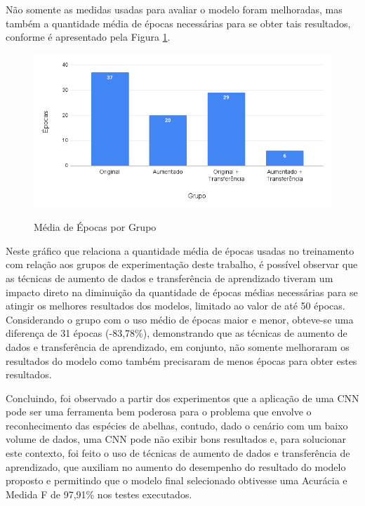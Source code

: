 \documentclass[
	12pt,				%
	oneside,			%
	a4paper,			%
	english,			%
	brazil				%
	]{abntex2ppgsi}
\begin{document}
Não somente as medidas usadas para avaliar o modelo foram melhoradas, mas também a quantidade média de épocas necessárias para se obter tais resultados, conforme é apresentado pela Figura \ref{fig:media_epocas_vs_grupo}.

\begin{figure}[H]
    \centering
    \caption{Média de Épocas por Grupo}
    \includegraphics[width=1.0\textwidth]{imagens/resultados_discussao/conclusao/media_epocas_vs_grupo.png}
    \label{fig:media_epocas_vs_grupo}
\end{figure}

Neste gráfico que relaciona a quantidade média de épocas usadas no treinamento com relação aos grupos de experimentação deste trabalho, é possível observar que as técnicas de aumento de dados e transferência de aprendizado tiveram um impacto direto na diminuição da quantidade de épocas médias necessárias para se atingir os melhores resultados dos modelos, limitado ao valor de até 50 épocas. Considerando o grupo com o uso médio de épocas maior e menor, obteve-se uma diferença de 31 épocas (-83,78\%), demonstrando que as técnicas de aumento de dados e transferência de aprendizado, em conjunto, não somente melhoraram os resultados do modelo como também precisaram de menos épocas para obter estes resultados.

Concluindo, foi observado a partir dos experimentos que a aplicação de uma CNN pode ser uma ferramenta bem poderosa para o problema que envolve o reconhecimento das espécies de abelhas, contudo, dado o cenário com um baixo volume de dados, uma CNN pode não exibir bons resultados e, para solucionar este contexto, foi feito o uso de técnicas de aumento de dados e transferência de aprendizado, que auxiliam no aumento do desempenho do resultado do modelo proposto e permitindo que o modelo final selecionado obtivesse uma Acurácia e Medida F de 97,91\% nos testes executados.
\end{document}
